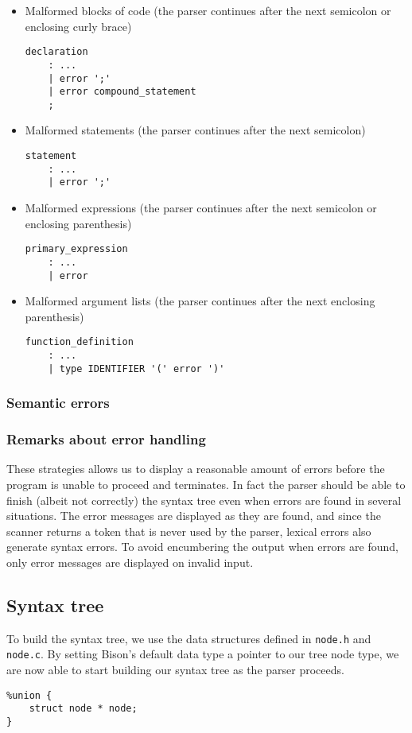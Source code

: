 \documentclass[12pt]{article}
\begin{document}
\begin{itemize}
\item  Malformed blocks of code (the parser continues after the next semicolon or enclosing
curly brace)
\begin{lstlisting}
declaration
	: ...
	| error ';'
	| error compound_statement
	;

\end{lstlisting}

\item  Malformed statements (the parser continues after the next semicolon)
\begin{lstlisting}
statement
	: ...
	| error ';'
\end{lstlisting}

\item  Malformed expressions (the parser continues after the next semicolon or enclosing
parenthesis)
\begin{lstlisting}
primary_expression
	: ...
	| error
\end{lstlisting}

\item  Malformed argument lists (the parser continues after the next enclosing parenthesis)
\begin{lstlisting}
function_definition
	: ...
	| type IDENTIFIER '(' error ')'
\end{lstlisting}
\end{itemize}


\subsubsection{Semantic errors}

\subsubsection{Remarks about error handling}
These strategies allows us to display a reasonable amount of errors before the program is unable
to proceed and terminates. In fact the parser should be able to finish (albeit not correctly)
the syntax tree even when errors are found in several situations.
The error messages are displayed as they are found, and since the
scanner returns a token that is never used by the parser, lexical errors also generate syntax
errors. To avoid encumbering the output when errors are found, only error messages are
displayed on invalid input.

\subsection{Syntax tree}
To build the syntax tree, we use the data structures defined in \texttt{node.h} and \texttt{node.c}.
By setting Bison's default data type a pointer to our tree node type, we are now able to start
building our syntax tree as the parser proceeds.
\begin{lstlisting}
%union {
	struct node * node;
}
\end{lstlisting}
\end{document}
